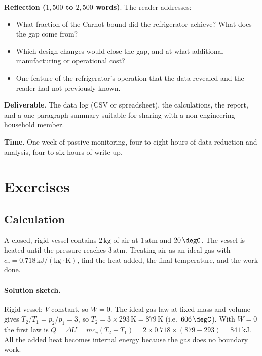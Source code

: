 \begin{project}
\textbf{Reflection ($1{,}500$ to $2{,}500$ words)}. The reader
addresses:

\begin{itemize}[leftmargin=*]
  \item What fraction of the Carnot bound did the refrigerator
    achieve? What does the gap come from?
  \item Which design changes would close the gap, and at what
    additional manufacturing or operational cost?
  \item One feature of the refrigerator's operation that the data
    revealed and the reader had not previously known.
\end{itemize}

\textbf{Deliverable}. The data log (CSV or spreadsheet), the
calculations, the report, and a one-paragraph summary suitable for
sharing with a non-engineering household member.

\textbf{Time}. One week of passive monitoring, four to eight hours of
data reduction and analysis, four to six hours of write-up.
\end{project}

\section{Exercises}

\subsection*{Calculation}

\begin{exercise}
A closed, rigid vessel contains $2\,\text{kg}$ of air at $1\,\text{atm}$
and $20\,\degC$. The vessel is heated until the pressure reaches $3\,
\text{atm}$. Treating air as an ideal gas with $c_v = 0.718\,
\text{kJ}/(\text{kg}\cdot\si{\kelvin})$, find the heat added, the
final temperature, and the work done.
\paragraph{Solution sketch.} Rigid vessel: $V$ constant, so $W = 0$. The
ideal-gas law at fixed mass and volume gives $T_2/T_1 = p_2/p_1 = 3$, so
$T_2 = 3 \times 293\,\si{\kelvin} = 879\,\si{\kelvin}$
(i.e.\ $606\,\degC$). With $W = 0$ the first law is $Q = \Delta U =
m c_v (T_2 - T_1) = 2 \times 0.718 \times (879 - 293) =
841\,\text{kJ}$. All the added heat becomes internal energy because the
gas does no boundary work.
\end{exercise}

